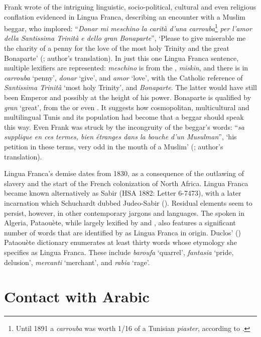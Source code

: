\documentclass[output=paper]{langsci/langscibook}
\begin{document}
	Frank wrote of the intriguing linguistic, socio-political, cultural and even religious conflation evidenced in Lingua Franca, describing an encounter with a Muslim beggar, who implored: “\textit{Donar mi meschino la carità d’una carrouba}\footnote{Until 1891 a \textit{carrouba} was worth 1/16 of a {Tunisian} \textit{piaster}, according to \citet{Rossetti1999}.} \textit{per l’amor della Santissima Trinità e dello gran Bonaparte}”, ‘Please to give miserable me the charity of a penny for the love of the most holy Trinity and the great Bonaparte’ (\citealt[101]{Frank1850}; author's translation). In just this one Lingua Franca sentence, multiple lexifiers are represented: \textit{meschino} is from the , \textit{miskīn}, and there is  in \textit{carrouba} ‘penny’, \textit{donar} ‘give’, and \textit{amor} ‘love’, with the  Catholic reference of \textit{Santissima Trinità} ‘most holy Trinity’, and  \textit{Bonaparte}. The latter would have still been Emperor and possibly at the height of his power. Bonaparte is qualified by \textit{gran} ‘great’, from the  or even . It suggests how cosmopolitan, multicultural and multilingual Tunis and its population had become that a beggar should speak this way. Even Frank was struck by the incongruity of the beggar’s words: ``\textit{sa supplique en ces termes, bien étranges dans la bouche d’un Musulman}'', ‘his petition in these terms, very odd in the mouth of a Muslim’ (\citealt[101]{Frank1850}; author's translation).
	
	Lingua Franca’s demise dates from 1830, as a consequence of the outlawing of slavery and the start of the French colonization of North Africa. Lingua Franca became known alternatively as Sabir (HSA 1882: Letter 6-7473), with a later incarnation which Schuchardt dubbed Judeo-Sabir (\citealt[87]{Schuchardt1909}). Residual elements seem to persist, however, in other contemporary jargons and languages. The  spoken in Algeria, Pataouète, while largely lexified by  and , also features a significant number of words that are identified by \citet{Lanly1962} as Lingua Franca in origin. Duclos’ (\citeyear{Duclos1992}) Pataouète dictionary enumerates at least thirty words whose etymology she specifies as Lingua Franca. These include \textit{baroufa} ‘quarrel', \textit{fantasia} ‘pride, delusion’, \textit{mercanti} ‘merchant’, and \textit{rabia} ‘rage’.
	
 \section{Contact with Arabic}
	
\end{document}
